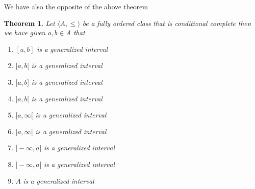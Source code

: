 \documentclass{book}
\newtheorem{theorem}{Theorem}
\begin{document}
We have also the opposite of the above theorem

\begin{theorem}
  \label{interval generalized condition (1)}Let $\langle A, \leqslant \rangle$
  be a fully ordered class that is conditional complete then we have given $a,
  b \in A$ that
  \begin{enumerate}
    \item $[a, b]$ is a generalized interval
    
    \item $[a, b [$ is a generalized interval
    
    \item $] a, b]$ is a generalized interval
    
    \item $] a, b [$ is a generalized interval
    
    \item $[a, \infty [$ is a generalized interval
    
    \item $] a, \infty [$ is a generalized interval
    
    \item $] - \infty, a]$ is a generalized interval
    
    \item $] - \infty, a [$ is a generalized interval
    
    \item $A$ is a generalized interval
  \end{enumerate}
\end{theorem}
\end{document}
